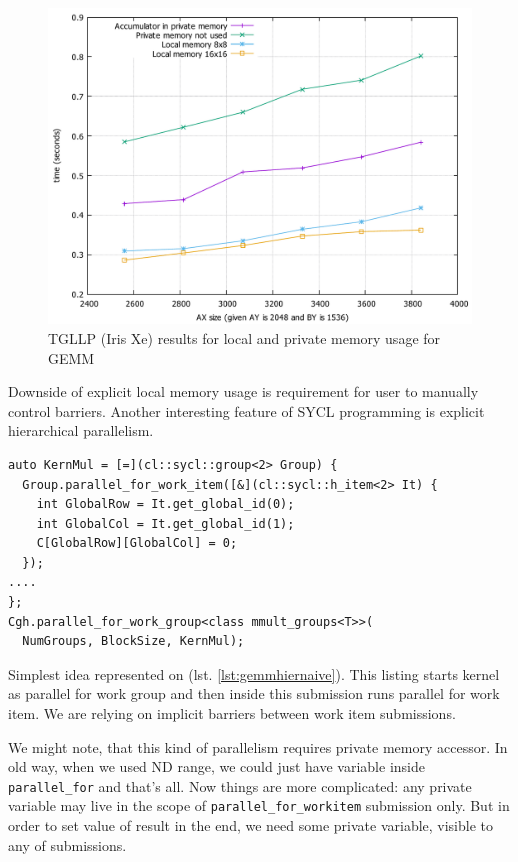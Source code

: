 \documentclass[a4paper,12pt,oneside]{article}
\begin{document}
\begin{figure}
\centering
\includegraphics[width=1.0\textwidth]{pictures/plot-gemm-tgllp.pdf}
\caption{TGLLP (Iris Xe) results for local and private memory usage for GEMM}
\label{fig:plot-gemm-tgllp}
\end{figure}

Downside of explicit local memory usage is requirement for user to manually control barriers. Another interesting feature of SYCL programming is explicit hierarchical parallelism.

\begin{lstlisting}[caption={Idea of hierarchial parallelism},label={lst:gemmhiernaive}]
auto KernMul = [=](cl::sycl::group<2> Group) {
  Group.parallel_for_work_item([&](cl::sycl::h_item<2> It) {
    int GlobalRow = It.get_global_id(0);
    int GlobalCol = It.get_global_id(1);
    C[GlobalRow][GlobalCol] = 0;
  });
....
};
Cgh.parallel_for_work_group<class mmult_groups<T>>(
  NumGroups, BlockSize, KernMul);
\end{lstlisting}

Simplest idea represented on (lst. \ref{lst:gemmhiernaive}). This listing starts kernel as parallel for work group and then inside this submission runs parallel for work item. We are relying on implicit barriers between work item submissions.

We might note, that this kind of parallelism requires private memory accessor. In old way, when we used ND range, we could just have variable inside \lstinline!parallel_for! and that's all. Now things are more complicated: any private variable may live in the scope of \lstinline!parallel_for_workitem! submission only. But in order to set value of result in the end, we need some private variable, visible to any of submissions.
\end{document}
